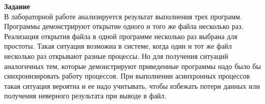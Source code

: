 \documentclass[a4paper,12pt]{article}
\begin{document}
\thispagestyle{empty}

\begin{figure}[th]
\noindent\centering{
}
\end{figure}

\newpage
\textbf {Задание}\\

В лабораторной работе анализируется результат выполнения трех программ. Программы демонстрируют открытие одного и того же файла несколько раз. Реализация открытия файла в одной программе несколько раз выбрана для простоты. Такая ситуация возможна в системе, когда один и тот же файл несколько раз открывают разные процессы. Но для получения ситуаций аналогичных тем, которые демонстрируют приведенные программы надо было бы синхронизировать работу процессов. При выполнении асинхронных процессов такая ситуация вероятна и ее надо учитывать, чтобы избежать потери данных или получения неверного результата при выводе в файл.
\end{document}
